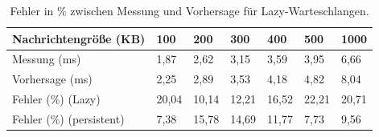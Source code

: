 \begin{table}
\centering
  \begin{tabular}{| l | l | l | l |l | l | l |}
    \hline
    Nachrichtengröße (KB) & 100 & 200 & 300 & 400 & 500 & 1000 \\ \hline
    Messung (ms) & 1,87 & 2,62 & 3,15 & 3,59 & 3,95 & 6,66\\ \hline
    Vorhersage (ms) & 2,25 & 2,89 & 3,53 & 4,18 & 4,82 & 8,04\\ \hline
    Fehler (\%) (Lazy) & 20,04 & 10,14 & 12,21 & 16,52 & 22,21 & 20,71\\ \hline
    Fehler (\%) (persistent) & 7,38 & 15,78 & 14,69 & 11,77 & 7,73 & 9,56\\ \hline
    
    \hline
      \end{tabular}
	\caption{\label{tab:simLazy} Fehler in \% zwischen Messung und Vorhersage für Lazy-Warteschlangen.}
\end{table}




